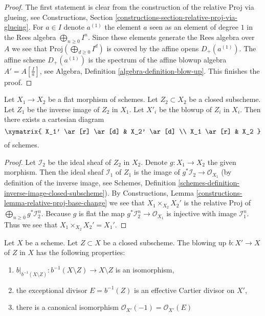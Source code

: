 \begin{proof}
The first statement is clear from the construction of the relative Proj via
glueing, see Constructions, Section
\ref{constructions-section-relative-proj-via-glueing}.
For $a \in I$ denote $a^{(1)}$ the element $a$ seen as an element of
degree $1$ in the Rees algebra $\bigoplus_{n \geq 0} I^n$.
Since these elements generate the Rees algebra over $A$ we see that
$\text{Proj}(\bigoplus_{d \geq 0} I^d)$ is covered by the affine opens
$D_{+}(a^{(1)})$. The affine scheme $D_{+}(a^{(1)})$ is the spectrum of 
the affine blowup algebra $A' = A[\frac{I}{a}]$, see
Algebra, Definition \ref{algebra-definition-blow-up}.
This finishes the proof.
\end{proof}

\begin{lemma}
\label{lemma-flat-base-change-blowing-up}
Let $X_1 \to X_2$ be a flat morphism of schemes. Let $Z_2 \subset X_2$ be a
closed subscheme. Let $Z_1$ be the inverse image of $Z_2$ in $X_1$.
Let $X'_i$ be the blowup of $Z_i$ in $X_i$. Then there exists a cartesian
diagram
$$
\xymatrix{
X_1' \ar[r] \ar[d] & X_2' \ar[d] \\
X_1 \ar[r] & X_2
}
$$
of schemes.
\end{lemma}

\begin{proof}
Let $\mathcal{I}_2$ be the ideal sheaf of $Z_2$ in $X_2$.
Denote $g : X_1 \to X_2$ the given morphism. Then the ideal sheaf
$\mathcal{I}_1$ of $Z_1$ is the image of
$g^*\mathcal{I}_2 \to \mathcal{O}_{X_1}$
(by definition of the inverse image, see
Schemes, Definition \ref{schemes-definition-inverse-image-closed-subscheme}).
By Constructions, Lemma \ref{constructions-lemma-relative-proj-base-change}
we see that $X_1 \times_{X_2} X_2'$ is the relative Proj of
$\bigoplus_{n \geq 0} g^*\mathcal{I}_2^n$. Because $g$ is flat the map
$g^*\mathcal{I}_2^n \to \mathcal{O}_{X_1}$ is injective with image
$\mathcal{I}_1^n$. Thus we see that $X_1 \times_{X_2} X_2' = X_1'$.
\end{proof}

\begin{lemma}
\label{lemma-blowing-up-gives-effective-Cartier-divisor}
Let $X$ be a scheme. Let $Z \subset X$ be a closed subscheme.
The blowing up $b : X' \to X$ of $Z$ in $X$
has the following properties:
\begin{enumerate}
\item $b|_{b^{-1}(X \setminus Z)} : b^{-1}(X \setminus Z) \to X \setminus Z$
is an isomorphism,
\item the exceptional divisor $E = b^{-1}(Z)$ is an effective Cartier divisor
on $X'$,
\item there is a canonical isomorphism
$\mathcal{O}_{X'}(-1) = \mathcal{O}_{X'}(E)$
\end{enumerate}
\end{lemma}

